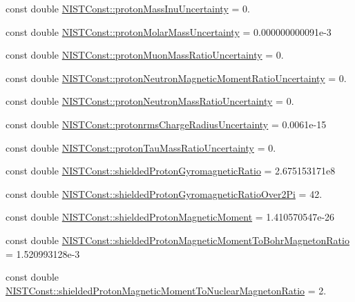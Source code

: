 \begin{DoxyCompactItemize}
\item 
const double \hyperlink{group___n_i_s_t_const-_proton_ga7746baf347356a9021e5493c88a05df2}{N\+I\+S\+T\+Const\+::proton\+Mass\+Inu\+Uncertainty} = 0.
\item 
const double \hyperlink{group___n_i_s_t_const-_proton_gaac054defc21692cb5ce9ed0508c44b42}{N\+I\+S\+T\+Const\+::proton\+Molar\+Mass\+Uncertainty} = 0.\+000000000091e-\/3
\item 
const double \hyperlink{group___n_i_s_t_const-_proton_gacdd50f0c4b94c56fd5b1b8064cbe6286}{N\+I\+S\+T\+Const\+::proton\+Muon\+Mass\+Ratio\+Uncertainty} = 0.
\item 
const double \hyperlink{group___n_i_s_t_const-_proton_ga2bef48ff6e07b2fd601818189686aac0}{N\+I\+S\+T\+Const\+::proton\+Neutron\+Magnetic\+Moment\+Ratio\+Uncertainty} = 0.
\item 
const double \hyperlink{group___n_i_s_t_const-_proton_ga722d9bfcefc00b2a9c4e40ffbb689518}{N\+I\+S\+T\+Const\+::proton\+Neutron\+Mass\+Ratio\+Uncertainty} = 0.
\item 
const double \hyperlink{group___n_i_s_t_const-_proton_ga0c56798c5c24948626558522705c2440}{N\+I\+S\+T\+Const\+::protonrms\+Charge\+Radius\+Uncertainty} = 0.\+0061e-\/15
\item 
const double \hyperlink{group___n_i_s_t_const-_proton_ga902ba548a0c988ed1dec5a82a4126da5}{N\+I\+S\+T\+Const\+::proton\+Tau\+Mass\+Ratio\+Uncertainty} = 0.
\item 
const double \hyperlink{group___n_i_s_t_const-_proton_ga2affce442da8b445cce1c580b41bbd82}{N\+I\+S\+T\+Const\+::shielded\+Proton\+Gyromagnetic\+Ratio} = 2.\+675153171e8
\item 
const double \hyperlink{group___n_i_s_t_const-_proton_ga5b2d223ede8fc141af04cef0486c2c52}{N\+I\+S\+T\+Const\+::shielded\+Proton\+Gyromagnetic\+Ratio\+Over2\+Pi} = 42.
\item 
const double \hyperlink{group___n_i_s_t_const-_proton_ga3e2c09881642d47d3e869c7803862e6f}{N\+I\+S\+T\+Const\+::shielded\+Proton\+Magnetic\+Moment} = 1.\+410570547e-\/26
\item 
const double \hyperlink{group___n_i_s_t_const-_proton_ga175eb518370bc31471e8ad763e760b72}{N\+I\+S\+T\+Const\+::shielded\+Proton\+Magnetic\+Moment\+To\+Bohr\+Magneton\+Ratio} = 1.\+520993128e-\/3
\item 
const double \hyperlink{group___n_i_s_t_const-_proton_ga03e84ef0d1452fa7c647f8866913fbc3}{N\+I\+S\+T\+Const\+::shielded\+Proton\+Magnetic\+Moment\+To\+Nuclear\+Magneton\+Ratio} = 2.

\end{DoxyCompactItemize}
